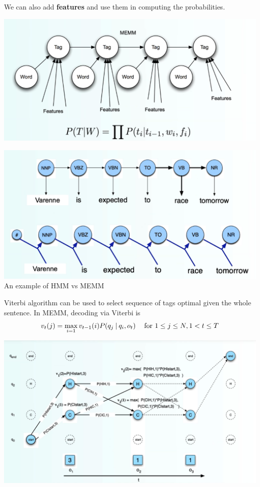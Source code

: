 \documentclass[10pt]{report}
\begin{document}
We can also add \textbf{features} and use them in computing the probabilities.
\begin{center}
	\includegraphics[scale=0.33]{17.png}
\end{center}
\begin{center}
	\includegraphics[scale=0.33]{18.png}\\
	An example of HMM vs MEMM
\end{center}
Viterbi algorithm can be used to select sequence of tags optimal given the whole sentence. In MEMM, decoding via Viterbi is
$$v_t(j) = \max_{i=1} v_{t-1}(i)P(q_j\:|\:q_i, o_t)\:\:\:\:\hbox{ for } 1\leq j\leq N, 1< t\leq T$$
\begin{center}
	\includegraphics[scale=0.5]{19.png}
\end{center}
\end{document}
